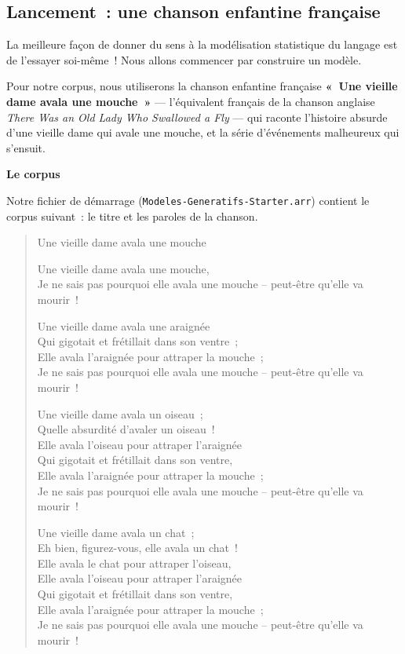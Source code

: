 \documentclass[12pt,a4paper]{article}
\begin{document}
\subsection{Lancement~: une chanson enfantine française}

La meilleure façon de donner du sens à la modélisation statistique du langage est de l'essayer soi-même~! Nous allons commencer par construire un modèle.

Pour notre corpus, nous utiliserons la chanson enfantine française \textbf{«~Une vieille dame avala une mouche~»} — l'équivalent français de la chanson anglaise \emph{There Was an Old Lady Who Swallowed a Fly} — qui raconte l'histoire absurde d'une vieille dame qui avale une mouche, et la série d'événements malheureux qui s'ensuit.

\begin{keypointbox}
  \textbf{Le corpus}

  Notre fichier de démarrage (\texttt{Modeles\allowbreak-Generatifs\allowbreak-Starter.arr}) contient le corpus suivant~: le titre et les paroles de la chanson.

  \vspace{0.5em}
  \begin{quote}
  \small
  Une vieille dame avala une mouche

  \medskip
  Une vieille dame avala une mouche,\\
  Je ne sais pas pourquoi elle avala une mouche -- peut-être qu'elle va mourir~!

  \medskip
  Une vieille dame avala une araignée\\
  Qui gigotait et frétillait dans son ventre~;\\
  Elle avala l'araignée pour attraper la mouche~;\\
  Je ne sais pas pourquoi elle avala une mouche -- peut-être qu'elle va mourir~!

  \medskip
  Une vieille dame avala un oiseau~;\\
  Quelle absurdité d'avaler un oiseau~!\\
  Elle avala l'oiseau pour attraper l'araignée\\
  Qui gigotait et frétillait dans son ventre,\\
  Elle avala l'araignée pour attraper la mouche~;\\
  Je ne sais pas pourquoi elle avala une mouche -- peut-être qu'elle va mourir~!

  \medskip
  Une vieille dame avala un chat~;\\
  Eh bien, figurez-vous, elle avala un chat~!\\
  Elle avala le chat pour attraper l'oiseau,\\
  Elle avala l'oiseau pour attraper l'araignée\\
  Qui gigotait et frétillait dans son ventre,\\
  Elle avala l'araignée pour attraper la mouche~;\\
  Je ne sais pas pourquoi elle avala une mouche -- peut-être qu'elle va mourir~!
  \end{quote}


\end{keypointbox}
\end{document}
